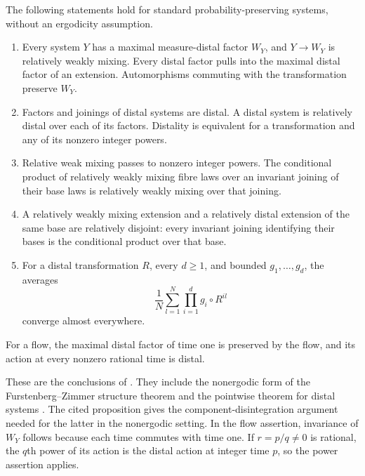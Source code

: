 \begin{proposition}\label{prop:structure}
The following statements hold for standard probability-preserving
systems, without an ergodicity assumption.
\begin{enumerate}
\item Every system $Y$ has a maximal measure-distal factor $W_Y$,
and $Y\to W_Y$ is relatively weakly mixing. Every distal factor
pulls into the maximal distal factor of an extension. Automorphisms
commuting with the transformation preserve $W_Y$.
\item Factors and joinings of distal systems are distal. A distal
system is relatively distal over each of its factors. Distality is
equivalent for a transformation and any of its nonzero integer powers.
\item Relative weak mixing passes to nonzero integer powers. The
conditional product of relatively weakly mixing fibre laws over an
invariant joining of their base laws is relatively weakly mixing
over that joining.
\item A relatively weakly mixing extension and a relatively distal
extension of the same base are relatively disjoint: every invariant
joining identifying their bases is the conditional product over
that base.
\item For a distal transformation $R$, every $d\ge1$, and bounded
$g_1,\ldots,g_d$, the averages
\[
 \frac1N\sum_{l=1}^N\prod_{i=1}^d g_i\circ R^{il}
\]
converge almost everywhere.
\end{enumerate}
For a flow, the maximal distal factor of time one is preserved by
the flow, and its action at every nonzero rational time is distal.
\end{proposition}

These are the conclusions of
\cite[Proposition~2.2]{FourfoldCompanion}. They include the
nonergodic form of the Furstenberg--Zimmer structure theorem
\cite{Zimmer1976,Jamneshan2023} and the pointwise theorem for
distal systems \cite[Theorem~C]{HuangShaoYe2019}. The cited proposition
gives the component-disintegration argument needed for the latter
in the nonergodic setting. In the flow assertion, invariance of
$W_Y$ follows because each time commutes with time one. If
$r=p/q\ne0$ is rational, the $q$th power of its action is the
distal action at integer time $p$, so the power assertion applies.

